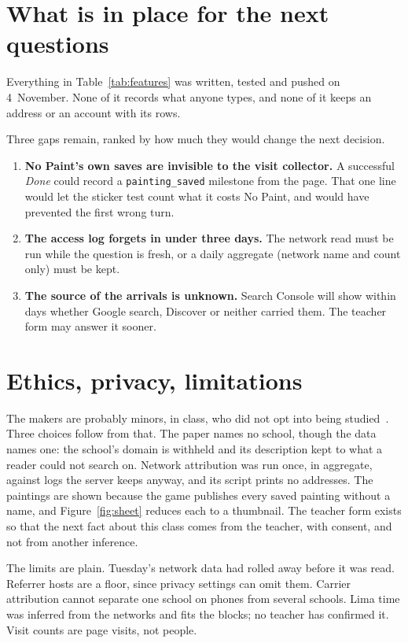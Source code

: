 \documentclass[10pt,letterpaper,twocolumn]{article}
\begin{document}
\section{What is in place for the next questions}
\label{sec:next}

Everything in Table~\ref{tab:features} was written, tested and pushed on
4~November. None of it records what anyone types, and none of it keeps
an address or an account with its rows.


Three gaps remain, ranked by how much they would change the next
decision.

\begin{enumerate}
\item \textbf{No Paint's own saves are invisible to the visit
collector.} A successful \emph{Done} could record a
\texttt{painting\_saved} milestone from the page. That one line would
let the sticker test count what it costs No Paint, and would have
prevented the first wrong turn.
\item \textbf{The access log forgets in under three days.} The network
read must be run while the question is fresh, or a daily aggregate
(network name and count only) must be kept.
\item \textbf{The source of the arrivals is unknown.} Search Console
will show within days whether Google search, Discover or neither carried
them. The teacher form may answer it sooner.
\end{enumerate}

\section{Ethics, privacy, limitations}

The makers are probably minors, in class, who did not opt into being
studied~\citep{livingstone2019children}. Three choices follow from
that. The paper names no school, though the data names one: the school's
domain is withheld and its description kept to what a reader could not
search on. Network attribution was run once, in aggregate, against logs
the server keeps anyway, and its script prints no addresses. The
paintings are shown because the game publishes every saved painting
without a name, and Figure~\ref{fig:sheet} reduces each to a thumbnail.
The teacher form exists so that the next fact about this class comes
from the teacher, with consent, and not from another inference.

The limits are plain. Tuesday's network data had rolled away before it
was read. Referrer hosts are a floor, since privacy settings can omit
them. Carrier attribution cannot separate one school on phones from
several schools. Lima time was inferred from the networks and fits the
blocks; no teacher has confirmed it. Visit counts are page visits, not
people.
\end{document}
